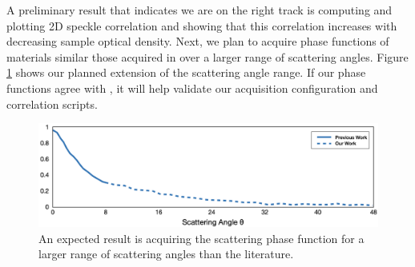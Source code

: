 A preliminary result that indicates we are on the right track is computing and plotting 2D speckle correlation and showing that this correlation increases with decreasing sample optical density. Next, we plan to acquire phase functions of materials similar those acquired in \cite{alterman2022direct} over a larger range of scattering angles. Figure \ref{fig:extended_phase_function} shows our planned extension of the scattering angle range. If our phase functions agree with \cite{alterman2022direct}, it will help validate our acquisition configuration and correlation scripts.
%
\begin{figure}
    \centering
    \includegraphics[width=\textwidth]{../figures/extended_phase_function.png}
    \caption{An expected result is acquiring the scattering phase function for a larger range of scattering angles than the literature.}
    \label{fig:extended_phase_function}
\end{figure}